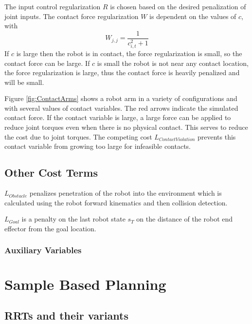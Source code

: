 \documentclass[../thesis.tex]{subfiles}
\begin{document}
The input control regularization $R$ is chosen based on the desired penalization of joint inputs. The contact force regularization $W$ is dependent on the values of $c$, with 
$$W_{j,j} = \frac{1}{c_{i,t}^2 + 1}$$
If $c$ is large then the robot is in contact, the force regularization is small, so the contact force can be large. If $c$ is small the robot is not near any contact location, the force regularization is large, thus the contact force is heavily penalized and will be small.

Figure \ref{fig:ContactArms} shows a robot arm in a variety of configurations and with several values of contact variables.
The red arrows indicate the simulated contact force.
If the contact variable is large, a large force can be applied to reduce joint torques even when there is no physical contact.
This serves to reduce the cost due to joint torques.
The competing cost $L_{Contact Violation}$ prevents this contact variable from growing too large for infeasible contacts.




\subsection{Other Cost Terms}
$L_{Obstacle}$ penalizes penetration of the robot into the environment which is calculated using the robot forward kinematics and then collision detection.

$L_{Goal}$ is a penalty on the last robot state $s_T$ on the distance of the robot end effector from the goal location.

\subsubsection{Auxiliary Variables}



\section{Sample Based Planning}
\subsection{RRTs and their variants}
\end{document}
